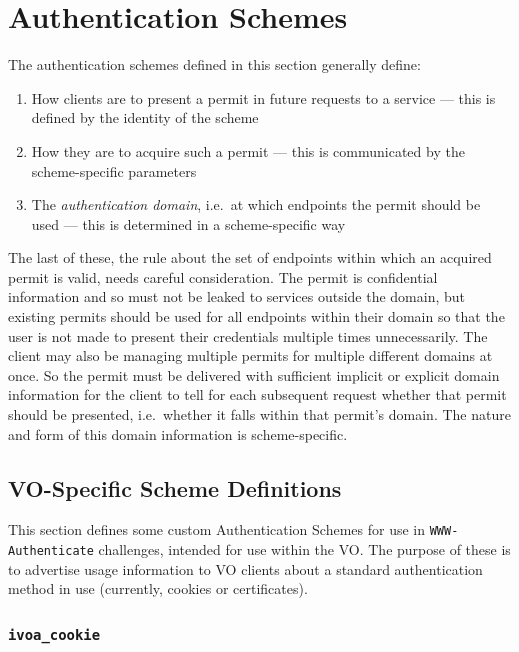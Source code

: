 \documentclass[11pt,a4paper]{ivoa}
\newcommand{\header}[1]{{\tt #1}}
\begin{document}
\section{Authentication Schemes}\label{sec:authschemes}

The authentication schemes defined in this section
generally define:
\begin{enumerate}
  \item How clients are to present a permit in future requests
        to a service --- this is defined by the identity of the scheme
  \item How they are to acquire such a permit ---
        this is communicated by the scheme-specific parameters
  \item The {\em authentication domain\/}, i.e.\ at which endpoints the permit
        should be used --- this is determined in a scheme-specific way
\end{enumerate}

The last of these, the rule about the set of endpoints within which
an acquired permit is valid, needs careful consideration.
The permit is confidential information and so must not be leaked to services
outside the domain,
but existing permits should be used for all endpoints within their domain
so that the user is not made to present their credentials multiple times
unnecessarily.
The client may also be managing multiple permits
for multiple different domains at once.
So the permit must be delivered with sufficient
implicit or explicit domain
information for the client to tell for each subsequent request
whether that permit should be presented,
i.e.\ whether it falls within that permit's domain.
The nature and form of this domain information is scheme-specific.



\subsection{VO-Specific Scheme Definitions}\label{sec:voschemes}

This section defines some custom Authentication Schemes
for use in \header{WWW-Authenticate} challenges,
intended for use within the VO.
The purpose of these is to advertise usage information to VO clients
about a standard authentication method in use
(currently, cookies or certificates).

\subsubsection{\mbox{\tt ivoa\_cookie}}\label{sec:ivoa-cookie}
\end{document}
